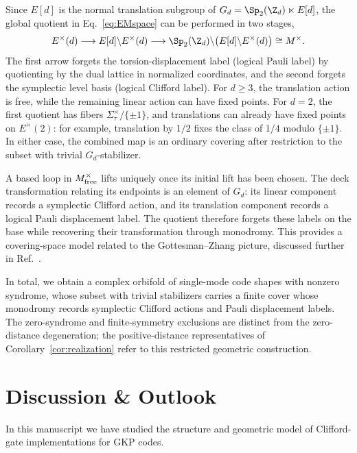 \documentclass[a4paper, aps, pra, 11pt, onecolumn, tightenlines, superscriptaddress]{revtex4-2}
\begin{document}
Since $E[d]$ is the normal translation subgroup of $G_d=\Sp_2(\Z_d)\ltimes E[d]$, the global quotient in Eq.~\eqref{eq:EMspace} can be performed in two stages,
\begin{equation}
E^\times(d)
\longrightarrow
E[d]\backslash E^\times(d)
\longrightarrow
\Sp_2(\Z_d)\backslash
\bigl(E[d]\backslash E^\times(d)\bigr)
\cong M^\times.
\end{equation}
The first arrow forgets the torsion-displacement label (logical Pauli label) by quotienting by the dual lattice in normalized coordinates, and the second forgets the symplectic level basis (logical Clifford label). For $d\geq3$, the translation action is free, while the remaining linear action can have fixed points. For $d=2$, the first quotient has fibers $\Sigma_\tau^\times/\{\pm1\}$, and translations can already have fixed points on $E^\times(2)$: for example, translation by $1/2$ fixes the class of $1/4$ modulo $\{\pm1\}$. In either case, the combined map is an ordinary covering after restriction to the subset with trivial $G_d$-stabilizer.

A based loop in $M^\times_{\rm free}$ lifts uniquely once its initial lift has been chosen. The deck transformation relating its endpoints is an element of $G_d$: its linear component records a symplectic Clifford action, and its translation component records a logical Pauli displacement label. The quotient therefore forgets these labels on the base while recovering their transformation through monodromy. This provides a covering-space model related to the Gottesman--Zhang picture, discussed further in Ref.~\cite{Burchards_GeometricGKP}.

In total, we obtain a complex orbifold of single-mode code shapes with nonzero syndrome, whose subset with trivial stabilizers carries a finite cover whose monodromy records symplectic Clifford actions and Pauli displacement labels. The zero-syndrome and finite-symmetry exclusions are distinct from the zero-distance degeneration; the positive-distance representatives of Corollary~\ref{cor:realization} refer to this restricted geometric construction.

\section{Discussion \& Outlook}
In this manuscript we have studied the structure and geometric model of Clifford-gate implementations for GKP codes. 
\end{document}
